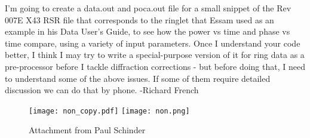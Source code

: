 \documentclass[crop=false,class=article,oneside]{standalone}
\begin{document}
I'm going to create a data.out and poca.out file for a small snippet of the Rev 007E X43 RSR file that corresponds to the ringlet that Essam used as an example in his Data User's Guide, to see how the power vs time and phase vs time compare, using a variety of input parameters. Once I understand your code better, I think I may try to write a special-purpose version of it for ring data as a pre-processor before I tackle diffraction corrections - but before doing that, I need to understand  some of the above issues. If some of them require detailed discussion we can do that by phone. -Richard French
\begin{figure}[H]
    \centering
    \captionsetup{type=figure}
    \texttt{[image: non\_copy.pdf]}
    \hfill
    \texttt{[image: non.png]}
    \caption{Attachment from Paul Schinder}
\end{figure}
\end{document}
